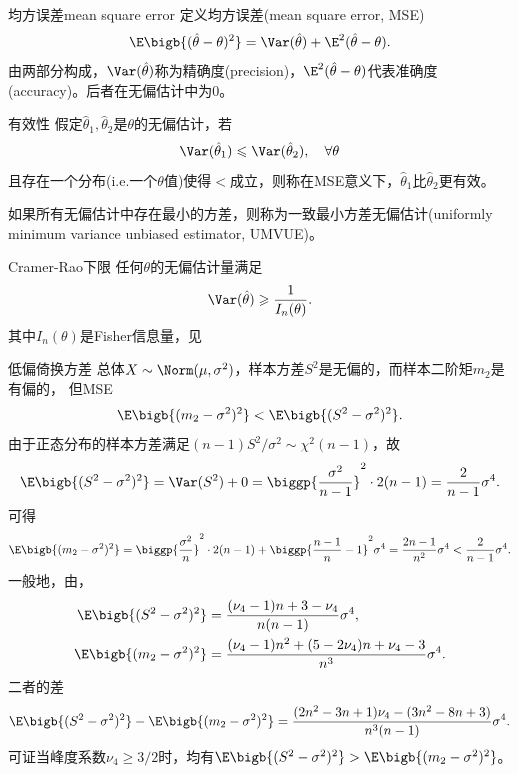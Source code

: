 \begin{definition}{均方误差}{mean square error}
	定义均方误差(mean square error, MSE)
	\begin{equation}
		\E\bigb{(\hat\theta-\theta)^2}=\Var(\hat\theta)+\E^2(\hat\theta-\theta).
	\end{equation}
	由两部分构成，$\Var(\hat\theta)$称为精确度(precision)，$\E^2(\hat\theta-\theta)$代表准确度(accuracy)。后者在无偏估计中为0。
\end{definition}
\begin{definition}{有效性}{}
	假定$\hat\theta_1,\hat\theta_2$是$\theta$的无偏估计，若
	\[
		\Var(\hat\theta_1)\leqslant\Var(\hat\theta_2),\quad\forall\theta
	\]
	且存在一个分布(i.e.一个$\theta$值)使得$<$成立，则称在MSE意义下，$\hat\theta_1$比$\hat\theta_2$更有效。
	
	如果所有无偏估计中存在最小的方差，则称为一致最小方差无偏估计(uniformly minimum variance unbiased estimator, UMVUE)。
\end{definition}
\begin{theorem}{Cramer-Rao下限}{}
	任何$\theta$的无偏估计量满足
	\begin{equation}
		\Var(\hat\theta)\geqslant\frac1{I_n(\theta)}.
	\end{equation}
	其中$I_n(\theta)$是Fisher信息量，见
\end{theorem}
\begin{example}{低偏倚换方差}{}
	总体$X\sim\Norm(\mu,\sigma^2)$，样本方差$S^2$是无偏的，而样本二阶矩$m_2$是有偏的，
	但MSE
	\[
		\E\bigb{(m_2-\sigma^2)^2}<\E\bigb{(S^2-\sigma^2)^2}.
	\]
	由于正态分布的样本方差满足$(n-1)S^2/\sigma^2\sim\chi^2(n-1)$，故
	\begin{equation}
		\E\bigb{(S^2-\sigma^2)^2}=\Var(S^2)+0=\biggp{\frac{\sigma^2}{n-1}}^2\cdot 2(n-1)=\frac{2}{n-1}\sigma^4.
	\end{equation}
	可得
	\[
		\E\bigb{(m_2-\sigma^2)^2}=\biggp{\frac{\sigma^2}{n}}^2\cdot 2(n-1)+\biggp{\frac{n-1}n-1}^2\sigma^4=\frac{2n-1}{n^2}\sigma^4<\frac{2}{n-1}\sigma^4.
	\]
	\tcblower
	一般地，由，
	\begin{align*}
		\E\bigb{(S^2-\sigma^2)^2}&=\frac{(\nu_4-1)n+3-\nu_4}{n(n-1)}\sigma^4,\\
		\E\bigb{(m_2-\sigma^2)^2}&=\frac{(\nu_4-1)n^2+(5-2\nu_4)n+\nu_4-3}{n^3}\sigma^4.
	\end{align*}
	二者的差
	\[
		\E\bigb{(S^2-\sigma^2)^2}-\E\bigb{(m_2-\sigma^2)^2}
		=\frac{(2n^2-3n+1)\nu_4-(3n^2-8n+3)}{n^3(n-1)}\sigma^4.
	\]
	可证当峰度系数$\nu_4\geqslant 3/2$时，均有$\E\bigb{(S^2-\sigma^2)^2}>\E\bigb{(m_2-\sigma^2)^2}$。
\end{example}

